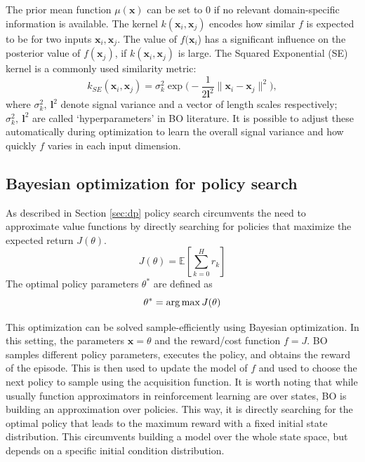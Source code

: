The prior mean function $\mu(\pmb{x})$ can be set to $0$ if no relevant domain-specific information is available. The kernel $k(\pmb{x}_i, \pmb{x}_j)$ encodes how similar $f$ is expected to be for two inputs $\pmb{x}_i, \pmb{x}_j$. 
The value of $f(\pmb{x}_i$) has a significant influence on the posterior value of $f(\pmb{x}_j)$, if $k(\pmb{x}_i, \pmb{x}_j)$ is large. The Squared Exponential (SE) kernel is a commonly used similarity metric:
\begin{equation}
k_{SE}(\pmb{x}_i, \pmb{x}_j) = \sigma_k^2 \exp\Big(- \frac{1}{2 \pmb{l}^2} \|\pmb{x}_i - \pmb{x}_j\|^2 \Big),
\end{equation}
where $\sigma_k^2, \ \pmb{l}^2$ denote signal variance and a vector of length scales respectively; $\sigma_k^2, \ \pmb{l}^2$ are called `hyperparameters' in BO literature. It is possible to adjust these automatically during optimization to learn the overall signal variance and how quickly $f$ varies in each input dimension. %


\subsection{Bayesian optimization for policy search}
 As described in Section \ref{sec:dp} policy search circumvents the need to approximate value functions by directly searching for policies that maximize the expected return $J(\theta)$.
 \begin{equation}
    J(\theta) = \mathds{E}[\sum_{k=0}^H r_k]
\end{equation}
The optimal policy parameters $\theta^*$ are defined as
\begin{equation}
    \theta^* = \operatorname*{arg\,max} J(\theta)
\end{equation}

This optimization can be solved sample-efficiently using Bayesian optimization. In this setting, the parameters $\mathbf{x} = \theta$ and the reward/cost function $f = J$. BO samples different policy parameters, executes the policy, and obtains the reward of the episode. This is then used to update the model of $f$ and used to choose the next policy to sample using the acquisition function. It is worth noting that while usually function approximators in reinforcement learning are over states, BO is building an approximation over policies. This way, it is directly searching for the optimal policy that leads to the maximum reward with a fixed initial state distribution. This circumvents building a model over the whole state space, but depends on a specific initial condition distribution. %


